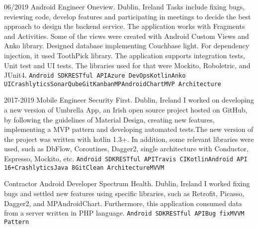 \documentclass[9pt]{developercv} %
\begin{document}
\newline
\begin{entrylist}
	\entry
		{06/2019}
		{Android Engineer }
		{Oneview. Dublin, Ireland}
{\newline
Tasks include fixing bugs, reviewing code, develop features and participating in meetings to decide the best approach to design the backend service. The application works with Fragments and Activities. Some of the views were created with Android Custom Views and Anko library. Designed database implementing Couchbase light. For dependency injection, it used ToothPick library. The application supports integration tests, Unit test and UI tests. The libraries used for that were Mockito, Roboletric, and JUnit4.
\newline
\newline
 {\texttt{Android SDK}\slashsep\texttt{RESTful API}\slashsep\texttt{Azure DevOps}\slashsep\texttt{Kotlin}\slashsep\texttt{Anko UI}\slashsep\texttt{Crashlytics}\slashsep\texttt{SonarQube}\slashsep\texttt{Git}\slashsep\texttt{Kanban}\slashsep\texttt{MPAndroidChart}\slashsep\texttt{MVP Architecture}}}

\entry
		{2017-2019}
		{Mobile Engineer}
		{Security First. Dublin, Ireland}
{\newline
I worked on developing a new version of Umbrella App, an Irish open source project hosted on GitHub, by following the guidelines of Material Design, creating new features, implementing a MVP pattern and developing automated tests.The new version of the project was written with kotlin 1.3+. In addition, some relevant libraries were used, such as DbFlow, Coroutines, Dagger2, single architecture with Conductor, Espresso, Mockito, etc.
\newline
\newline
 {\texttt{Android SDK}\slashsep\texttt{RESTful API}\slashsep\texttt{Travis CI}\slashsep\texttt{Kotlin}\slashsep\texttt{Android API 16+}\slashsep\texttt{Crashlytics}\slashsep\texttt{Java 8}\slashsep\texttt{Git}\slashsep\texttt{Clean Architecture}\slashsep\texttt{MVVM}}}

\entry
		{Contractor}
		{Android Developer}
		{Spectrum Health. Dublin, Ireland}
{\newline
I worked fixing bugs and settled new features using specific libraries, such as Retrofit, Picasso, Dagger2, and MPAndroidChart. Furthermore, this application consumed data from a server written in PHP language.
\newline
\newline
{\texttt{Android SDK}\slashsep\texttt{RESTful API}\slashsep\texttt{Bug fix}\slashsep\texttt{MVVM Pattern}}}


\end{entrylist}
\end{document}
